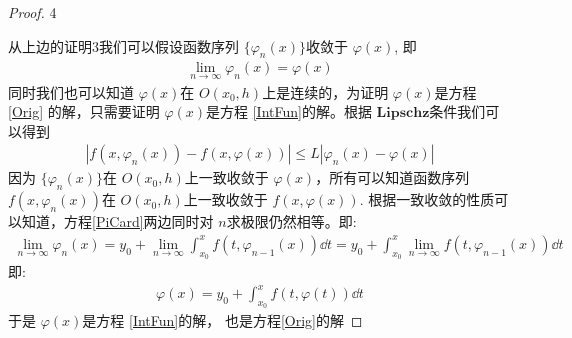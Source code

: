 \clearpage
\begin{proof}{\sf \color{orange} 4}\par
    从上边的\textsf{证明3}我们可以假设函数序列 $\{\varphi_n(x)\}$收敛于 $\varphi(x)$, 即
    \begin{align*}
        \lim_{n\to\infty}{\varphi_n(x)} = \varphi(x)
    \end{align*}
    同时我们也可以知道 $\varphi(x)$在 $O(x_0, h)$上是连续的，为证明 $\varphi(x)$是方程 \ref{Orig}
    的解，只需要证明 $\varphi(x)$是方程 \ref{IntFun}的解。根据 $\mathbf{Lipschz}$条件我们可以得到
    \begin{align*}
        \left|f(x, \varphi_n(x))-f(x, \varphi(x))\right| \le L\left|\varphi_n(x) -\varphi(x)\right|
    \end{align*}
    因为 $\{\varphi_n(x)\}$在 $O(x_0, h)$上一致收敛于 $\varphi(x)$，所有可以知道函数序列$f(x, \varphi_n(x))$在
    $O(x_0, h)$上一致收敛于 $f(x, \varphi(x))$. 根据一致收敛的性质可以知道，方程\ref{PiCard}两边同时对
    $n$求极限仍然相等。即:
    \begin{align*}
        \lim_{n\to\infty}{\varphi_n(x)} = y_0 + \lim_{n\to \infty}{\int_{x_0}^{x}{f(t, \varphi_{n-1}(x)) \dd t}}
        =y_0 + \int_{x_0}^{x}{\lim_{n\to \infty}{f(t, \varphi_{n-1}(x))} \dd t}
    \end{align*}
    即:
    \begin{align*}
        \varphi(x) = y_0 + \int_{x_0}^{x}{f(t, \varphi(t)) \dd t}
    \end{align*}
    于是 $\varphi(x)$是方程 \ref{IntFun}的解， 也是方程\ref{Orig}的解
\end{proof}


